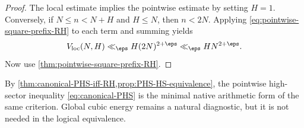 \begin{proof}
The local estimate implies the pointwise estimate by setting $H=1$.  Conversely, if $N\le n<N+H$ and $H\le N$, then $n<2N$.  Applying \cref{eq:pointwise-square-prefix-RH} to each term and summing yields
\[
 V_{\mathrm{loc}}(N,H)
 \ll_\eps H(2N)^{2+\eps}
 \ll_\eps HN^{2+\eps}.
\]
Now use \cref{thm:pointwise-square-prefix-RH}.
\end{proof}

By \cref{thm:canonical-PHS-iff-RH,prop:PHS-HS-equivalence}, the pointwise high-sector inequality \cref{eq:canonical-PHS} is the minimal native arithmetic form of the same criterion.  Global cubic energy remains a natural diagnostic, but it is not needed in the logical equivalence.

